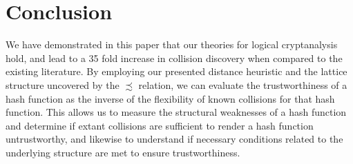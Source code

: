 \documentclass[conference]{IEEEtran}
\begin{document}
%






\section{Conclusion} \label{Sec:Conclusion}

We have demonstrated in this paper that our theories for logical
cryptanalysis hold, and lead to a 35 fold increase in collision
discovery when compared to the existing literature.  By employing our
presented distance heuristic and the lattice structure uncovered by
the $\precsim$ relation, we can evaluate the trustworthiness of a hash
function as the inverse of the flexibility of known collisions for
that hash function.  This allows us to measure the structural
weaknesses of a hash function and determine if extant collisions are sufficient
to render a hash function untrustworthy, and likewise to understand if
necessary conditions related to the underlying structure are met to
ensure trustworthiness.
\end{document}

